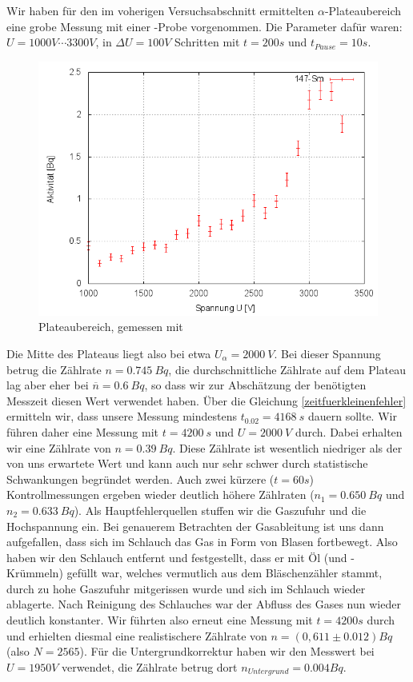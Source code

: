 Wir haben für den im voherigen Versuchsabschnitt ermittelten $\alpha$-Plateaubereich eine grobe Messung mit einer -Probe vorgenommen. Die Parameter dafür waren: $U= 1000V \cdots 3300V$, in $\Delta U = 100 V$ Schritten mit $t=200s$ und $t_{Pause} = 10s$.

\begin{figure}[H]
 \centering \includegraphics[width=0.9\linewidth]{Messwerte/plots/Sm147_plateau.png}
 \caption{Plateaubereich, gemessen mit }
\end{figure}

Die Mitte des Plateaus liegt also bei etwa $U_{\alpha} = 2000\ V$. Bei dieser Spannung betrug die Zählrate $n = 0.745\ Bq$, die durchschnittliche Zählrate auf dem Plateau lag aber eher bei $\overline{n} = 0.6\ Bq$, so dass wir zur Abschätzung der benötigten Messzeit diesen Wert verwendet haben. Über die Gleichung \ref{zeitfuerkleinenfehler} ermitteln wir, dass unsere Messung mindestens $t_{0.02} = 4168\ s$ dauern sollte. Wir führen daher eine Messung mit $t = 4200\ s$ und $ U = 2000\ V$ durch. Dabei erhalten wir eine Zählrate von $n = 0.39\ Bq$. Diese Zählrate ist wesentlich niedriger als der von uns erwartete Wert und kann auch nur sehr schwer durch statistische Schwankungen begründet werden. Auch zwei kürzere ($t = 60s$) Kontrollmessungen ergeben wieder deutlich höhere Zählraten ($n_1 = 0.650\ Bq$ und $n_2 = 0.633\ Bq$). Als Hauptfehlerquellen stuffen wir die Gaszufuhr und die Hochspannung ein. Bei genauerem Betrachten der Gasableitung ist uns dann aufgefallen, dass sich im Schlauch das Gas in Form von Blasen fortbewegt. Also haben wir den Schlauch entfernt und festgestellt, dass er mit Öl (und -Krümmeln) gefüllt war, welches vermutlich aus dem Bläschenzähler stammt, durch zu hohe Gaszufuhr mitgerissen wurde und sich im Schlauch wieder ablagerte. Nach Reinigung des Schlauches war der Abfluss des Gases nun wieder deutlich konstanter. Wir führten also erneut eine Messung mit $t=4200s$ durch und erhielten diesmal eine realistischere Zählrate von $n = (0,611 \pm 0.012) Bq$ (also $N = 2565$). Für die Untergrundkorrektur haben wir den Messwert bei $U = 1950V$ verwendet, die Zählrate betrug dort $n_{Untergrund} = 0.004 Bq$.

